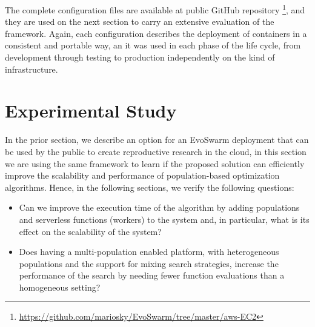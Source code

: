 \documentclass[review]{elsarticle}
\begin{document}
The complete configuration files are available at public GitHub repository 
\footnote{\url{https://github.com/mariosky/EvoSwarm/tree/master/aws-EC2}}, and
they are used on the next section to carry an extensive evaluation of the framework.
Again, each configuration describes the deployment of containers in a consistent
and portable way, an it was used in each phase of the life cycle, from
development through testing to production independently on the kind of
infrastructure.


\section{Experimental Study} 
\label{setup} %


In the prior section, we describe an option for an EvoSwarm deployment that can be used by 
the public to create reproductive research in the cloud, in this section we are
using the same framework to learn if the proposed solution can efficiently
improve the scalability and performance of population-based optimization
algorithms. %
Hence, in the following sections, we verify the following questions:

\begin{itemize}
\item Can we improve the execution time of the algorithm by adding populations
 and serverless functions (workers)  to the system and, in particular,
 what is its effect on the scalability of the system? %
 
\item Does having a multi-population enabled platform, with heterogeneous populations and
the support for mixing search strategies,  increase the performance of the
search by needing fewer function evaluations than a homogeneous setting? 

\end{itemize}
\end{document}
